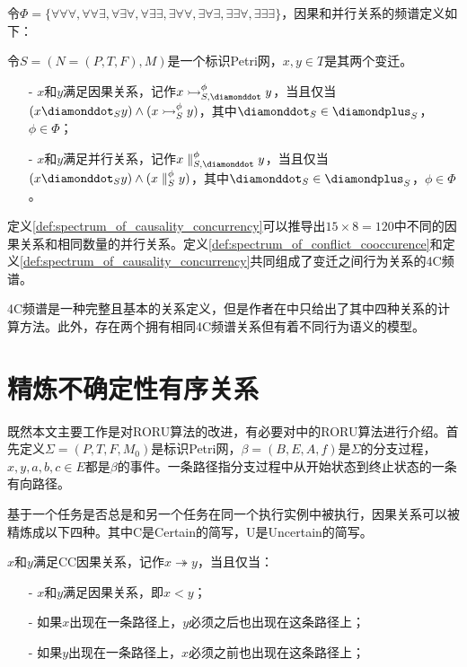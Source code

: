 令$\Phi=\{\forall\forall\forall,\forall\forall\exists,\forall\exists\forall,\forall\exists\exists,\exists\forall\forall,\exists\forall\exists,\exists\exists\forall,\exists\exists\exists\}$，因果和并行关系的频谱定义如下：
\begin{definition}[因果和并行关系的频谱]\label{def:spectrum_of_causality_concurrency}
令$S=(N=(P,T,F),M)$是一个标识Petri网，$x,y\in T$是其两个变迁。
  \begin{itemize}
    \item[-] $x$和$y$满足因果关系，记作$x\rightarrowtail_{S,\diamonddot}^{\phi}y$，当且仅当\\
    $(x\diamonddot_{S}y)\wedge(x\rightarrowtail_{S}^{\phi}y)$，其中$\diamonddot_{S}\in\diamondplus_{S}$，$\phi\in\Phi$；
    \item[-] $x$和$y$满足并行关系，记作$x\parallel_{S,\diamonddot}^{\phi}y$，当且仅当\\
    $(x\diamonddot_{S}y)\wedge(x\parallel_{S}^{\phi}y)$，其中$\diamonddot_{S}\in\diamondplus_{S}$，$\phi\in\Phi$。
  \end{itemize}
\end{definition}
定义\ref{def:spectrum_of_causality_concurrency}可以推导出$15\times 8=120$中不同的因果关系和相同数量的并行关系。定义\ref{def:spectrum_of_conflict_cooccurence}和定义\ref{def:spectrum_of_causality_concurrency}共同组成了变迁之间行为关系的4C频谱。

4C频谱是一种完整且基本的关系定义，但是作者在中只给出了其中四种关系的计算方法。此外，存在两个拥有相同4C频谱关系但有着不同行为语义的模型\cite{armas2014suitability}。

\section{精炼不确定性有序关系}\label{sec:roru}
既然本文主要工作是对RORU算法的改进，有必要对中的RORU算法进行介绍。首先定义$\Sigma=(P,T,F,M_{0})$是标识Petri网，$\beta=(B,E,A,f)$是$\Sigma$的分支过程，$x,y,a,b,c\in E$都是$\beta$的事件。一条路径指分支过程中从开始状态到终止状态的一条有向路径。

基于一个任务是否总是和另一个任务在同一个执行实例中被执行，因果关系可以被精炼成以下四种。其中C是Certain的简写，U是Uncertain的简写。

\begin{definition}\label{def:c_c_causal}
$x$和$y$满足CC因果关系，记作$x\twoheadrightarrow y$，当且仅当：
  \begin{itemize}
    \item[-] $x$和$y$满足因果关系，即$x<y$；
    \item[-] 如果$x$出现在一条路径上，$y$必须之后也出现在这条路径上；
    \item[-] 如果$y$出现在一条路径上，$x$必须之前也出现在这条路径上；
  \end{itemize}
\end{definition}

